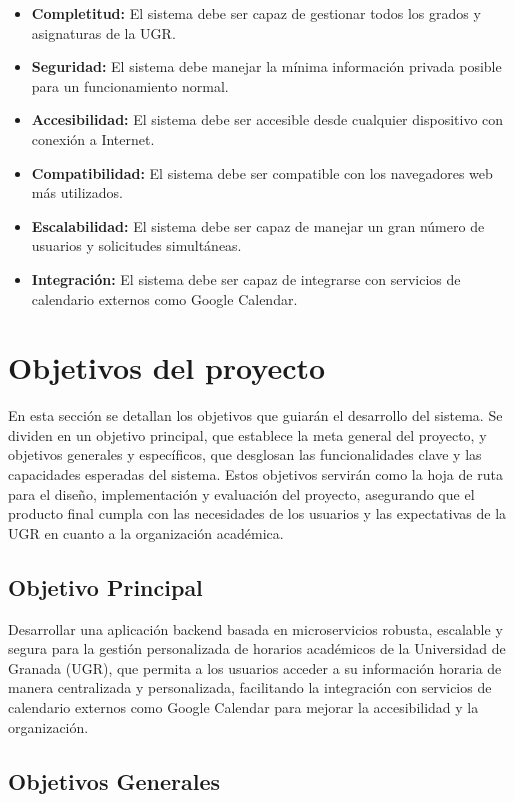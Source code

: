 \begin{itemize}
    \item \textbf{Completitud:} El sistema debe ser capaz de gestionar todos los grados y asignaturas de la UGR.
    \item \textbf{Seguridad:} El sistema debe manejar la mínima información privada posible para un funcionamiento normal.
    \item \textbf{Accesibilidad:} El sistema debe ser accesible desde cualquier dispositivo con conexión a Internet.
    \item \textbf{Compatibilidad:} El sistema debe ser compatible con los navegadores web más utilizados.
    \item \textbf{Escalabilidad:} El sistema debe ser capaz de manejar un gran número de usuarios y solicitudes simultáneas.
    \item \textbf{Integración:} El sistema debe ser capaz de integrarse con servicios de calendario externos como Google Calendar.
\end{itemize}

\section{Objetivos del proyecto}

En esta sección se detallan los objetivos que guiarán el desarrollo del sistema.
Se dividen en un objetivo principal, que establece la meta general del proyecto, y objetivos generales y específicos, que desglosan las funcionalidades clave y las capacidades esperadas del sistema. Estos objetivos servirán como la hoja de ruta para el diseño, implementación y evaluación del proyecto, asegurando que el producto final cumpla con las necesidades de los usuarios y las expectativas de la UGR en cuanto a la organización académica.

\subsection{Objetivo Principal}

Desarrollar una aplicación backend basada en microservicios robusta, escalable y segura para la gestión personalizada de horarios académicos de la Universidad de Granada (UGR), que permita a los usuarios acceder a su información horaria de manera centralizada y personalizada, facilitando la integración con servicios de calendario externos como Google Calendar para mejorar la accesibilidad y la organización.

\subsection{Objetivos Generales}

